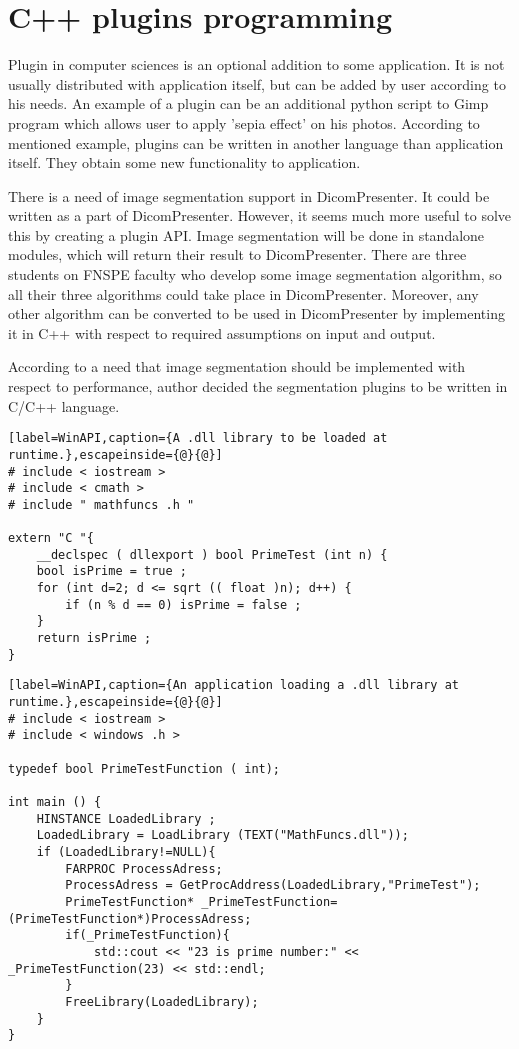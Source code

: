 \section*{C++ plugins programming}

Plugin in computer sciences is an optional addition to some application. It is not usually distributed with application itself, but can be added by user according to his needs. An example of a plugin can be an additional python script to Gimp program which allows user to apply 'sepia effect' on his photos. According to mentioned example, plugins can be written in another language than application itself. They obtain some new functionality to application.

There is a need of image segmentation support in DicomPresenter. It could be written as a part of DicomPresenter. However, it seems much more useful to solve this by creating a plugin API. Image segmentation will be done in standalone modules, which will return their result to DicomPresenter. There are three students on FNSPE faculty who develop some image segmentation algorithm, so all their three algorithms could take place in DicomPresenter. Moreover, any other algorithm can be converted to be used in DicomPresenter by implementing it in C++ with respect to required assumptions on input and output.

According to a need that image segmentation should be implemented with respect to performance, author decided the segmentation plugins to be written in C/C++ language.

\begin{lstlisting}[label=WinAPI,caption={A .dll library to be loaded at runtime.},escapeinside={@}{@}]
# include < iostream >
# include < cmath >
# include " mathfuncs .h "

extern "C "{
	__declspec ( dllexport ) bool PrimeTest (int n) {
	bool isPrime = true ;
	for (int d=2; d <= sqrt (( float )n); d++) {
		if (n % d == 0) isPrime = false ;
	}
	return isPrime ;
}
\end{lstlisting}

\begin{lstlisting}[label=WinAPI,caption={An application loading a .dll library at runtime.},escapeinside={@}{@}]
# include < iostream >
# include < windows .h >

typedef bool PrimeTestFunction ( int);

int main () {
	HINSTANCE LoadedLibrary ;
	LoadedLibrary = LoadLibrary (TEXT("MathFuncs.dll"));
	if (LoadedLibrary!=NULL){
		FARPROC ProcessAdress;
		ProcessAdress = GetProcAddress(LoadedLibrary,"PrimeTest");
		PrimeTestFunction* _PrimeTestFunction=(PrimeTestFunction*)ProcessAdress;
		if(_PrimeTestFunction){
			std::cout << "23 is prime number:" << _PrimeTestFunction(23) << std::endl;
		}
		FreeLibrary(LoadedLibrary);
	}
}
\end{lstlisting}